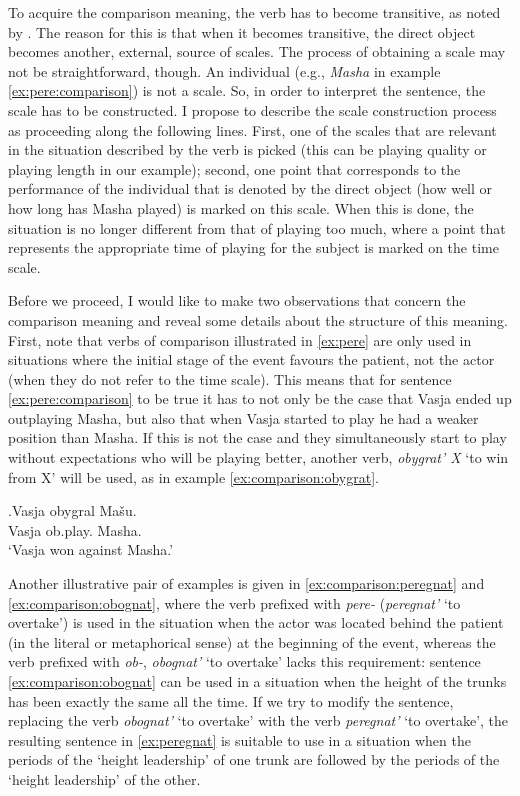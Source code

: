 To acquire the comparison meaning, the verb has to become transitive, as noted by \citet{Shvedova:82}. The reason for this is that when it becomes transitive, the direct object becomes another, external, source of scales. The process of obtaining a scale may not be straightforward, though. An individual (e.g., \textit{Masha} in example \ref{ex:pere:comparison}) is not a scale. So, in order to interpret the sentence, the scale has to be constructed. I propose to describe the scale construction process as proceeding along the following lines. First, one of the scales that are relevant in the situation described by the verb is picked (this can be playing quality or playing length in our example); second, one point that corresponds to the performance of the individual that is denoted by the direct object (how well or how long has Masha played) is marked on this scale. When this is done, the situation is no longer different from that of playing too much, where a point that represents the appropriate time of playing for the subject is marked on the time scale.

Before we proceed, I would like to make two observations that concern the comparison meaning and reveal some details about the structure of this meaning. First, note that verbs of comparison illustrated in \ref{ex:pere} are only used in situations where the initial stage of the event favours the patient, not the actor (when they do not refer to the time scale). This means that for sentence \ref{ex:pere:comparison} to be true it has to not only be the case that Vasja ended up outplaying Masha, but also that when Vasja started to play he had a weaker position than Masha. If this is not the case and they simultaneously start to play without expectations who will be playing better, another verb, \textit{obygrat' X} `to win from X' will be used, as in example \ref{ex:comparison:obygrat}. 

\exg.\label{ex:comparison:obygrat}Vasja obygral Ma\v{s}u.\\
Vasja ob.play. Masha.\\
\trans `Vasja won against Masha.'

Another illustrative pair of examples is given in \ref{ex:comparison:peregnat} and \ref{ex:comparison:obognat}, where the verb prefixed with \textit{pere-} (\textit{peregnat'} `to overtake') is used in the situation when the actor was located behind the patient (in the literal or metaphorical sense) at the beginning of the event, whereas the verb prefixed with {\textit{ob-},} \textit{obognat'} `to overtake' lacks this requirement: sentence \ref{ex:comparison:obognat} can be used in a situation when the height of the trunks has been exactly the same all the time. If we try to modify the sentence, replacing the verb \textit{obognat'} `to overtake' with the verb \textit{peregnat'} `to overtake', the resulting sentence in \ref{ex:peregnat} is suitable to use in a situation when the periods of the `height leadership' of one trunk are followed by the periods of the `height leadership' of the other.

